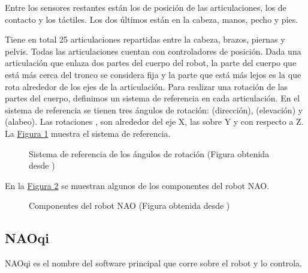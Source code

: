 Entre los sensores restantes están los de posición de las articulaciones, los
de contacto y los táctiles. Los dos últimos están en la cabeza, manos, pecho y
pies.

Tiene en total 25 articulaciones repartidas entre la cabeza, brazos,
piernas y pelvis. Todas las articulaciones cuentan con controladores de posición.
Dada una articulación que enlaza dos partes del cuerpo del robot, la parte
del cuerpo que está más cerca del tronco se considera fija y la parte que está
más lejos  es la que rota alrededor de los ejes de la articulación.
Para realizar una rotación de las partes del cuerpo, definimos un sistema
de referencia en cada articulación.
En el sistema de referencia se tienen tres ángulos de rotación:
 (dirección),  (elevación) y  (alabeo).
Las rotaciones , son
alrededor del eje X, las   sobre Y y  con respecto a Z. La
\hyperref[\detokenize{chapter_one/naoqi:rollpitchyaw-frame}]{Figura \ref{\detokenize{chapter_one/naoqi:rollpitchyaw-frame}}} muestra el sistema de referencia.

\begin{figure}[htbp]
\centering
\capstart

\noindent{}
\caption{Sistema de referencia de los ángulos de rotación (Figura obtenida desde \cite{rowpitchyawimagereference})}\label{\detokenize{chapter_one/naoqi:rollpitchyaw-frame}}\end{figure}

En la \hyperref[\detokenize{chapter_one/naoqi:nao-config}]{Figura \ref{\detokenize{chapter_one/naoqi:nao-config}}} se muestran algunos de los componentes del robot NAO.

\begin{figure}[htbp]
\centering
\capstart

\noindent{}
\caption{Componentes del robot NAO (Figura obtenida desde \cite{naoh25bodytype})}\label{\detokenize{chapter_one/naoqi:nao-config}}\end{figure}


\subsection{NAOqi}
\label{\detokenize{chapter_one/naoqi:naoqi}}
NAOqi es el nombre del software principal que corre sobre el robot y lo
controla.

